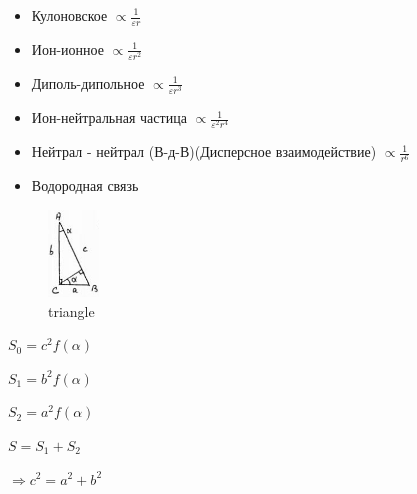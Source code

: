 
\begin{lecture}[Седьмая]
	\begin{lecSection}
	\begin{flushleft}	
		\begin{itemize}
			\item Кулоновское $\propto $\Large$\frac{1}{\varepsilon r}$ \normalsize	
			\item Ион-ионное $\propto $\Large$\frac{1}{\varepsilon r^2}$ \normalsize
			\item Диполь-дипольное $\propto$\Large$\frac{1}{\varepsilon r^3}$\normalsize
			\item Ион-нейтральная частица $\propto$\Large$\frac{1}{\varepsilon^2 r^4}$\normalsize
			\item Нейтрал - нейтрал (В-д-В)(Дисперсное взаимодействие) $\propto$\Large$\frac{1}{r^6}$\normalsize
			\item Водородная связь 
		\end{itemize}
	\end{flushleft}
	\end{lecSection}

	\begin{lecSection}

	\begin{figure}
    	\begin{center}
			\includegraphics[width=0.12\textwidth]{lecture_07/pic1}
     	\end{center}
     \caption{triangle}
	\end{figure}

	\par $S_0 = c^2 f(\alpha)$
	\par $S_1 = b^2 f(\alpha)$
	\par $S_2 = a^2 f(\alpha)$
	\par $S = S_1 + S_2$
	\par $\Rightarrow c^2 = a^2 + b^2$

	\end{lecSection}
	

\end{lecture}
